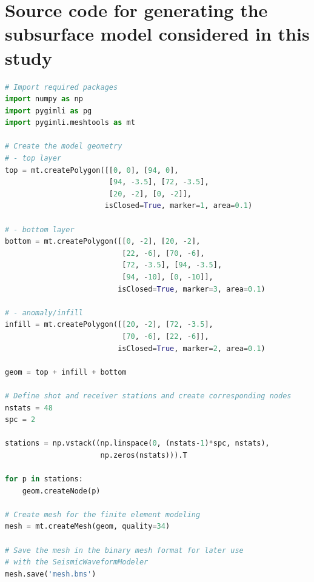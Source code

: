 \documentclass[a4paper,fleqn]{cas-sc}
\begin{document}
\section{Source code for generating the subsurface model considered in this study}
\begin{lstlisting}[language=Python]
# Import required packages
import numpy as np
import pygimli as pg
import pygimli.meshtools as mt

# Create the model geometry
# - top layer
top = mt.createPolygon([[0, 0], [94, 0], 
                        [94, -3.5], [72, -3.5], 
                        [20, -2], [0, -2]],
                       isClosed=True, marker=1, area=0.1)

# - bottom layer
bottom = mt.createPolygon([[0, -2], [20, -2], 
                           [22, -6], [70, -6], 
                           [72, -3.5], [94, -3.5], 
                           [94, -10], [0, -10]],
                          isClosed=True, marker=3, area=0.1)

# - anomaly/infill
infill = mt.createPolygon([[20, -2], [72, -3.5], 
                           [70, -6], [22, -6]],
                          isClosed=True, marker=2, area=0.1)

geom = top + infill + bottom

# Define shot and receiver stations and create corresponding nodes
nstats = 48
spc = 2

stations = np.vstack((np.linspace(0, (nstats-1)*spc, nstats), 
                      np.zeros(nstats))).T

for p in stations:
    geom.createNode(p)

# Create mesh for the finite element modeling
mesh = mt.createMesh(geom, quality=34)

# Save the mesh in the binary mesh format for later use 
# with the SeismicWaveformModeler
mesh.save('mesh.bms')
\end{lstlisting}


 
\end{document}
